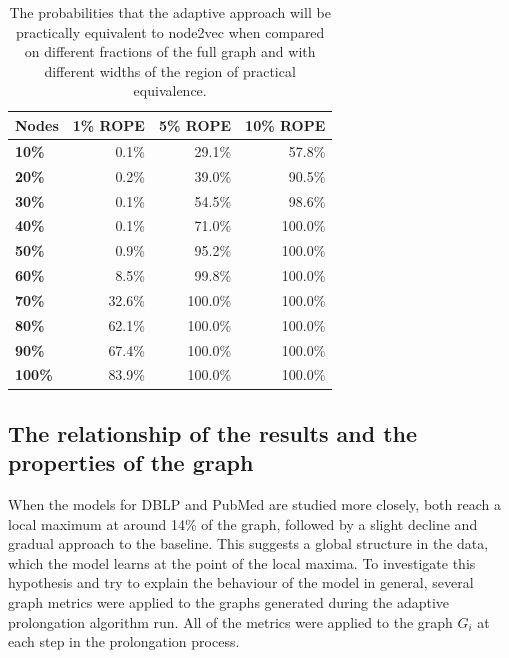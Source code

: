 \begin{table}
  \caption{The probabilities that the adaptive approach will be practically equivalent to node2vec when compared on different fractions of the full graph and with different widths of the region of practical equivalence.}
  \label{tab:bayesian-adaptive}
  \centering
  \begin{tabular}{lrrr}
    \toprule
    \textbf{Nodes} & \textbf{1\% ROPE} & \textbf{5\% ROPE} & \textbf{10\% ROPE} \\
    \midrule
    \textbf{10\%}  & 0.1\%             & 29.1\%            & 57.8\%             \\
    \textbf{20\%}  & 0.2\%             & 39.0\%            & 90.5\%             \\
    \textbf{30\%}  & 0.1\%             & 54.5\%            & 98.6\%             \\
    \textbf{40\%}  & 0.1\%             & 71.0\%            & 100.0\%            \\
    \textbf{50\%}  & 0.9\%             & 95.2\%            & 100.0\%            \\
    \textbf{60\%}  & 8.5\%             & 99.8\%            & 100.0\%            \\
    \textbf{70\%}  & 32.6\%            & 100.0\%           & 100.0\%            \\
    \textbf{80\%}  & 62.1\%            & 100.0\%           & 100.0\%            \\
    \textbf{90\%}  & 67.4\%            & 100.0\%           & 100.0\%            \\
    \textbf{100\%} & 83.9\%            & 100.0\%           & 100.0\%            \\
    \bottomrule
  \end{tabular}
\end{table}

\subsection{The relationship of the results and the properties of the graph}

When the models for DBLP and PubMed are studied more closely, both reach a local maximum at around 14\% of the graph, followed by a slight decline and gradual approach to the baseline. This suggests a global structure in the data, which the model learns at the point of the local maxima. To investigate this hypothesis and try to explain the behaviour of the model in general, several graph metrics were applied to the graphs generated during the adaptive prolongation algorithm run. All of the metrics were applied to the graph \( G_i \) at each step in the prolongation process.

